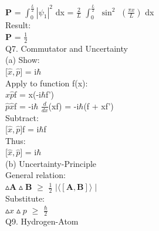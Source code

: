 \documentclass[a4paper, 10pt, onepage]{elegantbook}
\begin{document}
{$\mathbf {P}$ = $\int_0^{ \frac{L}{2}}|\psi_1|^2$ dx  
              = $\frac{2}{L}$ $\int_0^{\frac{L}{2}}$ $\sin^2$ $\left( \frac{\pi {x}}{L} \right)$ dx  \\
  
Result:  \\
  
$\mathbf {P}$ = $\frac{1}{2}$  \\

Q7. Commutator and Uncertainty  \\
  
(a) Show: \\ 

    [$\hat {x}, \hat {p}]$ = i$\hbar$  \\

    Apply to function f(x): \\
 
        $\hat {x} \hat {p}$f = x(-i$\hbar$f') \\
 
                                 $\hat {p} \hat {x}$f = -i$\hbar$ $\frac{d}{d{x}}$(xf) = -i$\hbar$(f + xf')  \\
   Subtract:  \\
  
        [$\hat x, \hat p]$f = i$\hbar$f \\
 
   Thus: \\
 
        [$\hat x, \hat p]$ = i$\hbar$ \\
 
(b) Uncertainty-Principle \\
                                                                                                
    General relation: \\
 
       $\vartriangle \mathbf A \vartriangle \mathbf B$ $\geq$ $\frac{1}{2}$ $\mid \langle [ \mathbf A, \mathbf B] \rangle \mid$ \\
  
    Substitute: \\
 
       $\vartriangle x \vartriangle p$ $\geq$ $\frac{\hbar}{2}$  \\

Q9. Hydrogen-Atom \\
                                                                                       
}
\end{document}
